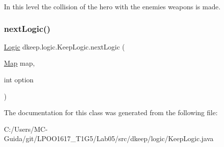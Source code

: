 In this level the collision of the hero with the enemies\textquotesingle{} weapons is made. \mbox{\label{classdkeep_1_1logic_1_1_keep_logic_ac88c1dcda340a853c14ae4f9a9f89095}} 
\subsubsection{\texorpdfstring{next\+Logic()}{nextLogic()}}
{\footnotesize\ttfamily \hyperlink{classdkeep_1_1logic_1_1_logic}{Logic} dkeep.\+logic.\+Keep\+Logic.\+next\+Logic (\begin{DoxyParamCaption}\item[{\hyperlink{classdkeep_1_1logic_1_1_map}{Map}}]{map,  }\item[{int}]{option }\end{DoxyParamCaption})}



The documentation for this class was generated from the following file\+:\begin{DoxyCompactItemize}
\item 
C\+:/\+Users/\+M\+C-\/\+Guida/git/\+L\+P\+O\+O1617\+\_\+\+T1\+G5/\+Lab05/src/dkeep/logic/Keep\+Logic.\+java\end{DoxyCompactItemize}
